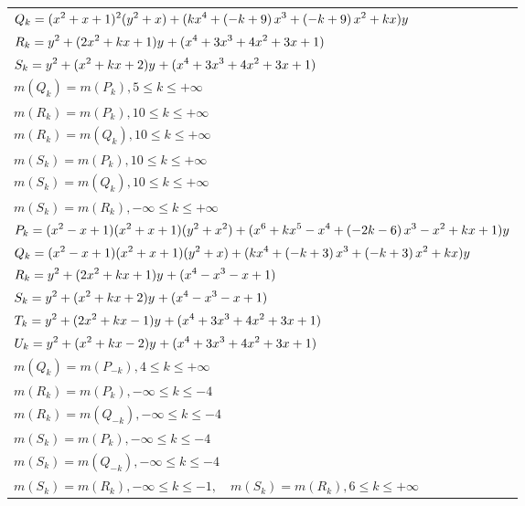 \documentclass{amsart}
\begin{document}
\begin{longtable}{|l|}
\(\displaystyle Q_k=(x^2
 + x
 + 1)^{2}(y^2+x)+(k\*x^4
 + \left(-k
 + 9\right) \*x^3
 + \left(-k
 + 9\right) \*x^2
 + k\*x)y\)\\
\(\displaystyle R_k=y^{2}+(2\*x^2
 + k\*x
 + 1)y^{}+(x^4
 + 3\*x^3
 + 4\*x^2
 + 3\*x
 + 1)\)\\
\(\displaystyle S_k=y^{2}+(x^2
 + k\*x
 + 2)y^{}+(x^4
 + 3\*x^3
 + 4\*x^2
 + 3\*x
 + 1)\)\\
\(\displaystyle m(Q_k) = m(P_{k}),5 \leqslant k \leqslant +\infty\)\\
\(\displaystyle m(R_k) = m(P_{k}),10 \leqslant k \leqslant +\infty\)\\
\(\displaystyle m(R_k) = m(Q_{k}),10 \leqslant k \leqslant +\infty\)\\
\(\displaystyle m(S_k) = m(P_{k}),10 \leqslant k \leqslant +\infty\)\\
\(\displaystyle m(S_k) = m(Q_{k}),10 \leqslant k \leqslant +\infty\)\\
\(\displaystyle m(S_k) = m(R_{k}),-\infty \leqslant k \leqslant +\infty\)\\
\hline
\(\displaystyle P_k=(x^2
 - x
 + 1)(x^2
 + x
 + 1)(y^2+x^2)+(x^6
 + k\*x^5
 - x^4
 + \left(-2\*k
 - 6\right) \*x^3
 - x^2
 + k\*x
 + 1)y\)\\
\(\displaystyle Q_k=(x^2
 - x
 + 1)(x^2
 + x
 + 1)(y^2+x)+(k\*x^4
 + \left(-k
 + 3\right) \*x^3
 + \left(-k
 + 3\right) \*x^2
 + k\*x)y\)\\
\(\displaystyle R_k=y^{2}+(2\*x^2
 + k\*x
 + 1)y^{}+(x^4
 - x^3
 - x
 + 1)\)\\
\(\displaystyle S_k=y^{2}+(x^2
 + k\*x
 + 2)y^{}+(x^4
 - x^3
 - x
 + 1)\)\\
\(\displaystyle T_k=y^{2}+(2\*x^2
 + k\*x
 - 1)y^{}+(x^4
 + 3\*x^3
 + 4\*x^2
 + 3\*x
 + 1)\)\\
\(\displaystyle U_k=y^{2}+(x^2
 + k\*x
 - 2)y^{}+(x^4
 + 3\*x^3
 + 4\*x^2
 + 3\*x
 + 1)\)\\
\(\displaystyle m(Q_k) = m(P_{-k}),4 \leqslant k \leqslant +\infty\)\\
\(\displaystyle m(R_k) = m(P_{k}),-\infty \leqslant k \leqslant -4\)\\
\(\displaystyle m(R_k) = m(Q_{-k}),-\infty \leqslant k \leqslant -4\)\\
\(\displaystyle m(S_k) = m(P_{k}),-\infty \leqslant k \leqslant -4\)\\
\(\displaystyle m(S_k) = m(Q_{-k}),-\infty \leqslant k \leqslant -4\)\\
\(\displaystyle m(S_k) = m(R_{k}),-\infty \leqslant k \leqslant -1,\quad m(S_k) = m(R_{k}),6 \leqslant k \leqslant +\infty\)\\

\end{longtable}
\end{document}
